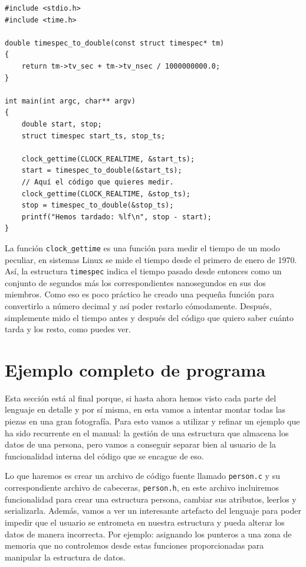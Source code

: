 \documentclass[a4paper]{article}
\begin{document}
\noindent
\begin{minipage}[H]{\linewidth}
\mbox{}
\begin{lstlisting}[style=C,
caption={Cómo medir el tiempo},
label={lst:measure_times}]
#include <stdio.h>
#include <time.h>

double timespec_to_double(const struct timespec* tm)
{
    return tm->tv_sec + tm->tv_nsec / 1000000000.0;
}

int main(int argc, char** argv)
{
    double start, stop;
    struct timespec start_ts, stop_ts;

    clock_gettime(CLOCK_REALTIME, &start_ts);
    start = timespec_to_double(&start_ts);
    // Aquí el código que quieres medir.
    clock_gettime(CLOCK_REALTIME, &stop_ts);
    stop = timespec_to_double(&stop_ts);
    printf("Hemos tardado: %lf\n", stop - start);
}
\end{lstlisting}
\end{minipage}

La función \verb!clock_gettime! es una función para medir el tiempo de un modo
peculiar, en sistemas Linux se mide el tiempo desde el primero de enero de
1970. Así, la estructura \verb!timespec! indica el tiempo pasado desde entonces
como un conjunto de segundos más los correspondientes nanosegundos en sus dos
miembros. Como eso es poco práctico he creado una pequeña función para
convertirlo a número decimal y así poder restarlo cómodamente. Después,
simplemente mido el tiempo antes y después del código que quiero saber cuánto
tarda y los resto, como puedes ver.

\section{Ejemplo completo de programa}
Esta sección está al final porque, si hasta ahora hemos visto cada parte del
lenguaje en detalle y por sí misma, en esta vamos a intentar montar todas las
piezas en una gran fotografía. Para esto vamos a utilizar y refinar un ejemplo
que ha sido recurrente en el manual: la gestión de una estructura que almacena
los datos de una persona, pero vamos a conseguir separar bien al usuario de la
funcionalidad interna del código que se encague de eso.

Lo que haremos es crear un archivo de código fuente llamado \verb!person.c! y
su correspondiente archivo de cabeceras, \verb!person.h!, en este archivo
incluiremos funcionalidad para crear una estructura persona, cambiar
sus atributos, leerlos y serializarla. Además, vamos a ver un interesante
artefacto del lenguaje para poder impedir que el usuario se entrometa en
nuestra estructura y pueda alterar los datos de manera incorrecta. Por ejemplo:
asignando los punteros a una zona de memoria que no controlemos desde estas
funciones proporcionadas para manipular la estructura de datos.
\end{document}
